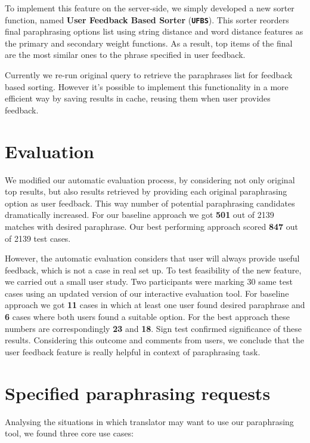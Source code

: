 To implement this feature on the server-side, we simply developed a new sorter function, named \textbf{User Feedback Based Sorter} (\texttt{\textbf{UFBS}}). This sorter reorders final paraphrasing options list using string distance and word distance features as the primary and secondary weight functions. As a result, top items of the final are the most similar ones to the phrase specified in user feedback. 

Currently we re-run original query to retrieve the paraphrases list for feedback based sorting. However it's possible to implement this functionality in a more efficient way by saving results in cache, reusing them when user provides feedback. 

\section{Evaluation}

We modified our automatic evaluation process, by considering not only original top results, but also results retrieved by providing each original paraphrasing option as user feedback. This way number of potential paraphrasing candidates dramatically increased. For our baseline approach we got \textbf{501} out of 2139 matches with desired paraphrase. Our best performing approach scored \textbf{847} out of 2139 test cases. 

However, the automatic evaluation considers that user will always provide useful feedback, which is not a case in real set up. To test feasibility of the new feature, we carried out a small user study. Two participants were marking 30 same test cases using an updated version of our interactive evaluation tool. For baseline approach we got \textbf{11} cases in which at least one user found desired paraphrase and \textbf{6} cases where both users found a suitable option. For the best approach these numbers are correspondingly \textbf{23} and \textbf{18}. Sign test confirmed significance of these results. Considering this outcome and comments from users, we conclude that the user feedback feature is really helpful in context of paraphrasing task.

\section{Specified paraphrasing requests}

Analysing the situations in which translator may want to use our paraphrasing tool, we found three core use cases:

